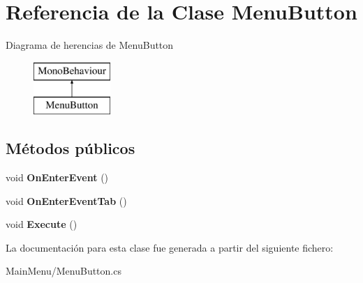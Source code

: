 \hypertarget{class_menu_button}{}\section{Referencia de la Clase Menu\+Button}
\label{class_menu_button}
Diagrama de herencias de Menu\+Button\begin{figure}[H]
\begin{center}
\leavevmode
\includegraphics[height=2.000000cm]{class_menu_button}
\end{center}
\end{figure}
\subsection*{Métodos públicos}
\begin{DoxyCompactItemize}
\item 
\mbox{\label{class_menu_button_ab023310f5a656d619dba3d006df55520}} 
void {\bfseries On\+Enter\+Event} ()
\item 
\mbox{\label{class_menu_button_ab62a32b6f3e254a883de5bb7ad6007dc}} 
void {\bfseries On\+Enter\+Event\+Tab} ()
\item 
\mbox{\label{class_menu_button_ad2cf1b797001328270ffbc6f001627e5}} 
void {\bfseries Execute} ()
\end{DoxyCompactItemize}


La documentación para esta clase fue generada a partir del siguiente fichero\+:\begin{DoxyCompactItemize}
\item 
Main\+Menu/Menu\+Button.\+cs\end{DoxyCompactItemize}
